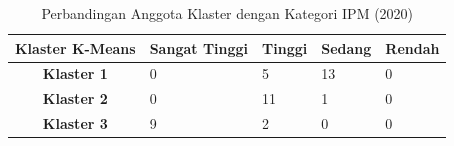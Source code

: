 \begin{table}[H]
\centering
\caption{Perbandingan Anggota Klaster dengan Kategori IPM (2020)} \label{tab:ipm_cross_2020}
\begin{tabular}{|c|p{2cm}|p{2cm}|p{2cm}|p{2cm}|}
\hline
\textbf{Klaster K-Means} & \textbf{Sangat Tinggi} & \textbf{Tinggi} & \textbf{Sedang} & \textbf{Rendah} \\ \hline
\textbf{Klaster 1} & 0 & 5 & 13 & 0 \\ \hline
\textbf{Klaster 2} & 0 & 11 & 1 & 0 \\ \hline
\textbf{Klaster 3} & 9 & 2 & 0 & 0 \\ \hline
\end{tabular}
\end{table}